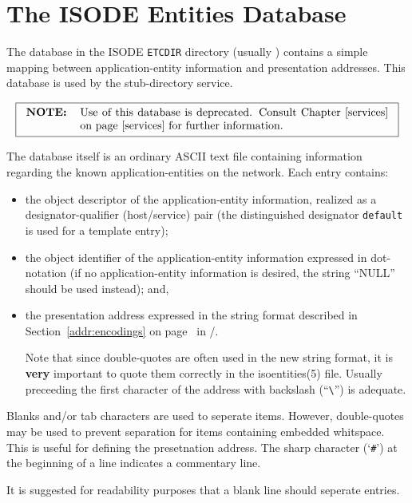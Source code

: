 
\chapter	{The ISODE Entities Database}\label{isoentities}
The database  in the ISODE \verb"ETCDIR" directory
(usually )
contains a simple mapping between
appli\-cat\-ion-entity information and presentation addresses.
This database is used by the stub-directory service.

\[\fbox{\begin{tabular}{lp{0.8\textwidth}}
\bf NOTE:&	Use of this database is deprecated.
		Consult Chapter~\ref{services} on page~\pageref{services}
		for further information.
\end{tabular}}\]

The database itself is an ordinary ASCII text file containing information
regarding the known ap\-pli\-ca\-tion-entities on the network.
Each entry contains:
\begin{itemize}
\item	the object descriptor of the application-entity information,
	realized as a designator-qualifier (host/service) pair
	(the distinguished designator \verb"default" is used for a template
	entry);

\item	the object identifier of the application-entity information
	expressed in dot-notation
	(if no application-entity information is desired,
	the string ``NULL'' should be used instead);
	and,

\item	the presentation address expressed in the string format described
	in Section~\ref{addr:encodings} on page~\pageref{addr:encodings} in
	\volone/.

	Note that since double-quotes are often used in the new string format,
	it is {\bf very\/} important to quote them correctly in the 
	\man isoentities(5) file.
	Usually preceeding the first character of the address with backslash
	(``\verb"\"'') is adequate.
\end{itemize}
Blanks and/or tab characters are used to seperate items.
However, double-quotes may be used to prevent separation for items containing
embedded whitspace.
This is useful for defining the presetnation address.
The sharp character (`\verb"#"') at the beginning of a line indicates a
commentary line.

It is suggested for readability purposes that a blank line should seperate
entries. 

